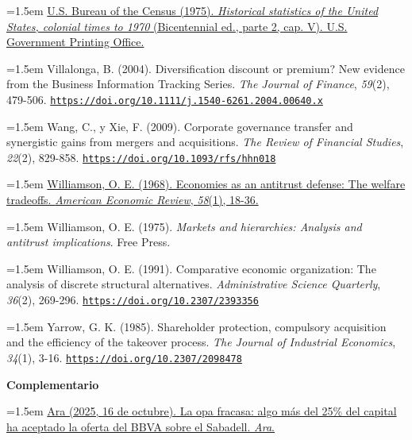 \documentclass[10pt,a4paper]{article}
\begin{document}
\noindent\hangindent=1.5em \href{https://www2.census.gov/library/publications/1975/compendia/hist_stats_colonial-1970/hist_stats_colonial-1970p2-chV.pdf}{U.S. Bureau of the Census (1975). \textit{Historical statistics of the United States, colonial times to 1970} (Bicentennial ed., parte 2, cap. V). U.S. Government Printing Office.}

\noindent\hangindent=1.5em Villalonga, B. (2004). Diversification discount or premium? New evidence from the Business Information Tracking Series. \textit{The Journal of Finance}, \textit{59}(2), 479-506. \href{https://doi.org/10.1111/j.1540-6261.2004.00640.x}{\nolinkurl{https://doi.org/10.1111/j.1540-6261.2004.00640.x}}

\noindent\hangindent=1.5em Wang, C., y Xie, F. (2009). Corporate governance transfer and synergistic gains from mergers and acquisitions. \textit{The Review of Financial Studies}, \textit{22}(2), 829-858. \href{https://doi.org/10.1093/rfs/hhn018}{\nolinkurl{https://doi.org/10.1093/rfs/hhn018}}

\noindent\hangindent=1.5em \href{https://www.jstor.org/stable/1831653}{Williamson, O. E. (1968). Economies as an antitrust defense: The welfare tradeoffs. \textit{American Economic Review}, \textit{58}(1), 18-36.}

\noindent\hangindent=1.5em Williamson, O. E. (1975). \textit{Markets and hierarchies: Analysis and antitrust implications}. Free Press.

\noindent\hangindent=1.5em Williamson, O. E. (1991). Comparative economic organization: The analysis of discrete structural alternatives. \textit{Administrative Science Quarterly}, \textit{36}(2), 269-296. \href{https://doi.org/10.2307/2393356}{\nolinkurl{https://doi.org/10.2307/2393356}}

\noindent\hangindent=1.5em Yarrow, G. K. (1985). Shareholder protection, compulsory acquisition and the efficiency of the takeover process. \textit{The Journal of Industrial Economics}, \textit{34}(1), 3-16. \href{https://doi.org/10.2307/2098478}{\nolinkurl{https://doi.org/10.2307/2098478}}

\textbf{Complementario}

\noindent\hangindent=1.5em \href{https://es.ara.cat/economia/banca/opa-fracasa-25-47-aceptado-oferta-bbva-sabadell_1_5531511.html}{Ara (2025, 16 de octubre). La opa fracasa: algo más del 25\% del capital ha aceptado la oferta del BBVA sobre el Sabadell. \textit{Ara}.}
\end{document}
